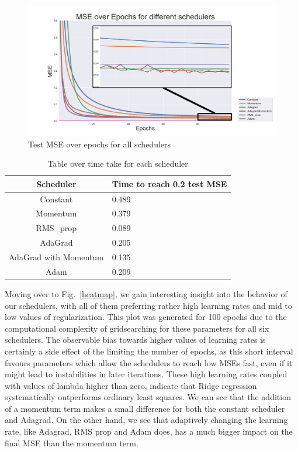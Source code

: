 \documentclass[onecolumn,10pt,cleanfoot]{asme2ej}
\begin{document}
\begin{figure}[H]
\centerline{\includegraphics[width=7in]{figure/fin_all_schedulers.jpg}}
\caption{Test MSE over epochs for all schedulers}
\label{figall}
\end{figure}

\begin{table}[H]
\caption{Table over time take for each scheduler}
\begin{center}
\label{timetable}
\begin{tabular}{| c | l |}
\hline
Scheduler & Time to reach 0.2 test MSE \\
\hline
Constant & 0.489 \\
Momentum & 0.379 \\
RMS\_prop & 0.089 \\
AdaGrad & 0.205 \\
AdaGrad with Momentum & 0.135 \\
Adam & 0.209 \\
\hline
\end{tabular}
\end{center}
\end{table}

Moving over to Fig.~\ref{heatmap}, we gain interesting insight into the behavior of our schedulers, with all of them preferring rather high learning rates and mid to low values of regularization. This plot was generated for 100 epochs due to the computational complexity of gridsearching for these parameters for all six schedulers. The observable bias towards higher values of learning rates is certainly a side effect of the limiting the number of epochs, as this short interval favours parameters which allow the schedulers to reach low MSEs fast, even if it might lead to instabilities in later iterations. These high learning rates coupled with values of lambda higher than zero, indicate that Ridge regression systematically outperforms ordinary least squares. We can see that the addition of a momentum term makes a small difference for both the constant scheduler and Adagrad. On the other hand, we see that adaptively changing the learning rate, like Adagrad, RMS prop and Adam does, has a much bigger impact on the final MSE than the momentum term.
\end{document}
